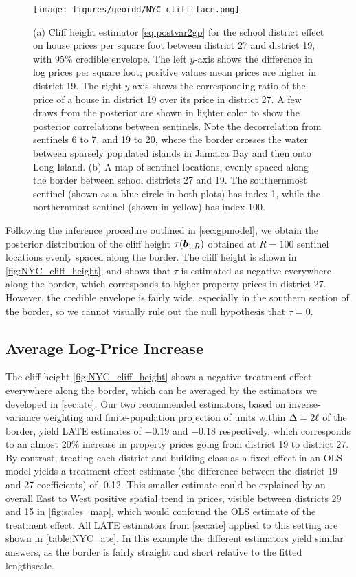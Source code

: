 \begin{figure}[tb]
    \centering
    \texttt{[image: figures/geordd/NYC\_cliff\_face.png]}
    \caption{\label{fig:NYC_cliff_height}
        (a)
        Cliff height estimator \autoref{eq:postvar2gp} for the school district effect on house prices per square foot between district 27 and district 19, with 95\% credible envelope.
        The left \(y\)-axis shows the difference in log prices per square foot; positive values mean prices are higher in district 19.
        The right \(y\)-axis shows the corresponding ratio of the price of a house in district 19 over its price in district 27.
        A few draws from the posterior are shown in lighter color to show the posterior correlations between sentinels.
        Note the decorrelation from sentinels 6 to 7, and 19 to 20, where the border crosses the water between sparsely populated islands in Jamaica Bay and then onto Long Island.
        (b)
        A map of sentinel locations, evenly spaced along the border between school districts 27 and 19.
        The southernmost sentinel (shown as a blue circle in both plots) has index 1, while the northernmost sentinel (shown in yellow) has index 100.
    }
\end{figure}

Following the inference procedure outlined in \autoref{sec:gpmodel}, we obtain the posterior distribution of the cliff height \(\tau(\bm{b}_{1:R})\) obtained at \(R=100\) sentinel locations evenly spaced along the border.
The cliff height is shown in \autoref{fig:NYC_cliff_height}, and shows that \(\tau\) is estimated as negative everywhere along the border, which corresponds to higher property prices in district 27.
However, the credible envelope is fairly wide, especially in the southern section of the border, so we cannot visually rule out the null hypothesis that \(\tau=0\).

\subsection{Average Log-Price Increase}
The cliff height \autoref{fig:NYC_cliff_height} shows a negative treatment effect everywhere along the border, which can be averaged by the estimators we developed in \autoref{sec:ate}.
Our two recommended estimators, based on inverse-variance weighting and finite-population projection of units within \(\Delta=2\ell\) of the border, yield LATE estimates of \(-0.19\) and \(-0.18\) respectively, which corresponds to an almost 20\% increase in property prices going from district 19 to district 27.
By contrast, treating each district and building class as a fixed effect in an OLS model yields a treatment effect estimate (the difference between the district 19 and 27 coefficients) of -0.12. 
This smaller estimate could be explained by an overall East to West positive spatial trend in prices, visible between districts 29 and 15 in \autoref{fig:sales_map}, which would confound the OLS estimate of the treatment effect.
All LATE estimators from \autoref{sec:ate} applied to this setting are shown in \autoref{table:NYC_ate}.
In this example the different estimators yield similar answers, as the border is fairly straight and short relative to the fitted lengthscale.


